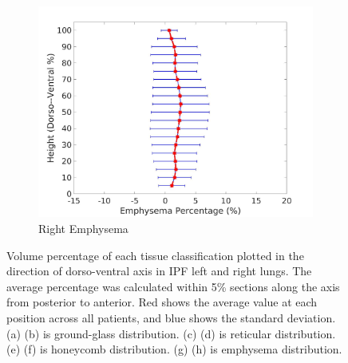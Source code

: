 \begin{figure}[H]
\begin{subfigure}{.42\linewidth}
  \includegraphics[width=\linewidth,trim={{.0\wd0} {.0\wd0} {.0\wd0} {.0\wd0}},clip]{QuantitativeAnalysis/Image/RightLungEmphysemaDiseaseDorsoToVentral.jpg}
  \caption{Right Emphysema}
  \label{fig:DiseaseDorsoToVentral-h}
\end{subfigure}
\caption{Volume percentage of each tissue classification plotted in the direction of dorso-ventral axis in IPF left and right lungs. The average percentage was calculated within 5\% sections along the axis from posterior to anterior. Red shows the average value at each position across all patients, and blue shows the standard deviation. (a) (b) is ground-glass distribution. (c) (d) is reticular distribution. (e) (f) is honeycomb distribution. (g) (h) is emphysema distribution.}
\label{fig:DiseaseDorsoToVentral}
\end{figure}

